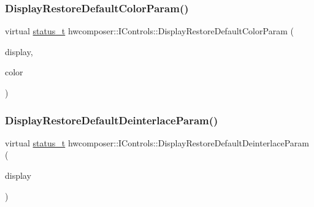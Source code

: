 \mbox{\label{classhwcomposer_1_1IControls_ac3eec02e6b87c04fc9856e0b5b28b9b9}} 
\subsubsection{\texorpdfstring{Display\+Restore\+Default\+Color\+Param()}{DisplayRestoreDefaultColorParam()}}
{\footnotesize\ttfamily virtual \mbox{\hyperlink{hwcserviceapi_8h_a3806fb2027d9a316d8ca8d9b8b8eb96f}{status\+\_\+t}} hwcomposer\+::\+I\+Controls\+::\+Display\+Restore\+Default\+Color\+Param (\begin{DoxyParamCaption}\item[{uint32\+\_\+t}]{display,  }\item[{\mbox{\hyperlink{hwcserviceapi_8h_a1d1cbf448ce748672cf3dd96675d70e4}{E\+Hwcs\+Color\+Control}}}]{color }\end{DoxyParamCaption})\hspace{0.3cm}{\ttfamily [pure virtual]}}

\mbox{\label{classhwcomposer_1_1IControls_aeb24361552467205e292bfe7a733760e}} 
\subsubsection{\texorpdfstring{Display\+Restore\+Default\+Deinterlace\+Param()}{DisplayRestoreDefaultDeinterlaceParam()}}
{\footnotesize\ttfamily virtual \mbox{\hyperlink{hwcserviceapi_8h_a3806fb2027d9a316d8ca8d9b8b8eb96f}{status\+\_\+t}} hwcomposer\+::\+I\+Controls\+::\+Display\+Restore\+Default\+Deinterlace\+Param (\begin{DoxyParamCaption}\item[{uint32\+\_\+t}]{display }\end{DoxyParamCaption})\hspace{0.3cm}{\ttfamily [pure virtual]}}

